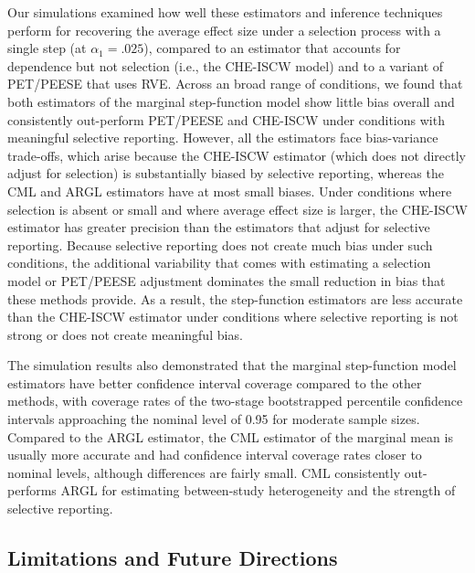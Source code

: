 \documentclass[
  man, donotrepeattitle,floatsintext]{apa7}
\begin{document}
Our simulations examined how well these estimators and inference techniques perform for recovering the average effect size under a selection process with a single step (at \(\alpha_1 = .025\)), compared to an estimator that accounts for dependence but not selection (i.e., the CHE-ISCW model) and to a variant of PET/PEESE that uses RVE.
Across an broad range of conditions, we found that both estimators of the marginal step-function model show little bias overall and consistently out-perform PET/PEESE and CHE-ISCW under conditions with meaningful selective reporting.
However, all the estimators face bias-variance trade-offs, which arise because the CHE-ISCW estimator (which does not directly adjust for selection) is substantially biased by selective reporting, whereas the CML and ARGL estimators have at most small biases.
Under conditions where selection is absent or small and where average effect size is larger, the CHE-ISCW estimator has greater precision than the estimators that adjust for selective reporting.
Because selective reporting does not create much bias under such conditions, the additional variability that comes with estimating a selection model or PET/PEESE adjustment dominates the small reduction in bias that these methods provide.
As a result, the step-function estimators are less accurate than the CHE-ISCW estimator under conditions where selective reporting is not strong or does not create meaningful bias.

The simulation results also demonstrated that the marginal step-function model estimators have better confidence interval coverage compared to the other methods, with coverage rates of the two-stage bootstrapped percentile confidence intervals approaching the nominal level of 0.95 for moderate sample sizes.
Compared to the ARGL estimator, the CML estimator of the marginal mean is usually more accurate and had confidence interval coverage rates closer to nominal levels, although differences are fairly small.
CML consistently out-performs ARGL for estimating between-study heterogeneity and the strength of selective reporting.

\subsection{Limitations and Future Directions}\label{limitations-and-future-directions}
\end{document}
